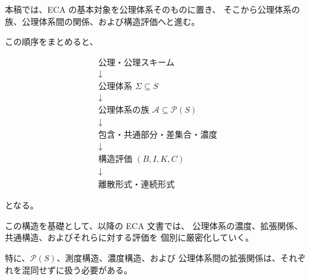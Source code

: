 \documentclass[12pt,a4paper]{article}
\begin{document}
本稿では、ECA の基本対象を公理体系そのものに置き、
そこから公理体系の族、公理体系間の関係、および構造評価へと進む。

この順序をまとめると、

\[
\boxed{
\begin{array}{c}
\text{公理・公理スキーム}\\[2mm]
\downarrow\\
\text{公理体系 }\Sigma\subseteq S\\[2mm]
\downarrow\\
\text{公理体系の族 }\mathscr{A}\subseteq\mathcal{P}(S)\\[2mm]
\downarrow\\
\text{包含・共通部分・差集合・濃度}\\[2mm]
\downarrow\\
\text{構造評価 }(B,I,K,C)\\[2mm]
\downarrow\\
\text{離散形式・連続形式}
\end{array}
}
\]

となる。

この構造を基礎として、以降の ECA 文書では、
公理体系の濃度、拡張関係、共通構造、およびそれらに対する評価を
個別に厳密化していく。

特に、$\mathcal{P}(S)$、測度構造、濃度構造、および
公理体系間の拡張関係は、それぞれを混同せずに扱う必要がある。
\end{document}
